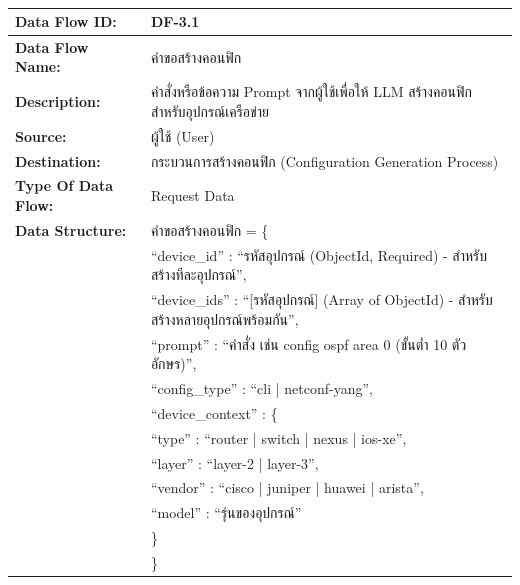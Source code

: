 
\begin{table}[H]
    \caption{}
    \label{tab:df-3-1}
    \fontSixTeen 
    \begin{tabularx}{\textwidth}{|l|L|} 
        \hline
        \textbf{Data Flow ID:} & DF-3.1 \\
        \hline
        \textbf{Data Flow Name:} & คำขอสร้างคอนฟิก \\
        \hline
        \textbf{Description:} & คำสั่งหรือข้อความ Prompt จากผู้ใช้เพื่อให้ LLM สร้างคอนฟิกสำหรับอุปกรณ์เครือข่าย \\
        \hline
        \textbf{Source:} & ผู้ใช้ (User) \\
        \hline
        \textbf{Destination:} & กระบวนการสร้างคอนฟิก (Configuration Generation Process) \\
        \hline
        \textbf{Type Of Data Flow:} & Request Data \\
        \hline
        \textbf{Data Structure:} & คำขอสร้างคอนฟิก = \{ \nonumber \\
                        & \hspace{1em} ``device\_id'' : ``รหัสอุปกรณ์ (ObjectId, Required) - สำหรับสร้างทีละอุปกรณ์'', \nonumber \\
                        & \hspace{1em} ``device\_ids'' : ``[รหัสอุปกรณ์] (Array of ObjectId) - สำหรับสร้างหลายอุปกรณ์พร้อมกัน'', \nonumber \\
                        & \hspace{1em} ``prompt'' : ``คำสั่ง เช่น config ospf area 0 (ขั้นต่ำ 10 ตัวอักษร)'', \nonumber \\
                        & \hspace{1em} ``config\_type'' : ``cli | netconf-yang'', \nonumber \\
                        & \hspace{1em} ``device\_context'' : \{ \nonumber \\
                        & \hspace{2em} ``type'' : ``router | switch | nexus | ios-xe'', \nonumber \\
                        & \hspace{2em} ``layer'' : ``layer-2 | layer-3'', \nonumber \\
                        & \hspace{2em} ``vendor'' : ``cisco | juniper | huawei | arista'', \nonumber \\
                        & \hspace{2em} ``model'' : ``รุ่นของอุปกรณ์'' \nonumber \\
                        & \hspace{1em} \} \nonumber \\
                        & \} \\
        \hline
    \end{tabularx}
\end{table}

